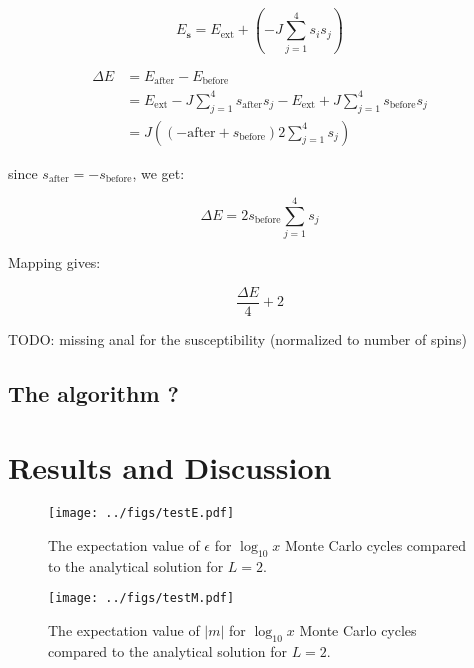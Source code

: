 \documentclass[english,notitlepage,reprint,nofootinbib]{revtex4-1}  %
\begin{document}
\begin{equation}
    E_{\mathbf{s}} = E_{\text{ext}} + \left( -J \sum\limits_{j = 1}^4 s_i s_j \right)
\end{equation}

\begin{align*}
    \Delta E &= E_{\text{after}} - E_{\text{before}} \\
    &= E_{\text{ext}} - J \sum\limits_{j = 1}^4 s_{\text{after}} s_j - E_{\text{ext}} + J \sum\limits_{j = 1}^4 s_{\text{before}} s_j \\
    &= J \left( \left( - \text{after} + s_{\text{before}} \right) 2 \sum\limits_{j = 1}^4 s_j \right)
\end{align*}

since $s_{\text{after}} = - s_{\text{before}}$, we get:

\begin{equation}
    \Delta E = 2 s_{\text{before}} \sum\limits_{j = 1}^4 s_j
\end{equation}

Mapping gives:

\begin{equation}
    \frac{\Delta E}{4} + 2
\end{equation}

TODO: missing anal for the susceptibility (normalized to number of spins)


\subsection*{The algorithm ?}

\section{Results and Discussion}\label{sec:results}

\begin{figure}[H]
	\centering
	\texttt{[image: ../figs/testE.pdf]} %
	\caption{The expectation value of $\epsilon$ for $\log_{10} x$ Monte Carlo cycles compared to the analytical solution for $L=2$.}
	\label{fig:testE}
\end{figure}

\begin{figure}[H]
	\centering
	\texttt{[image: ../figs/testM.pdf]} %
	\caption{The expectation value of $|m|$ for $\log_{10} x$ Monte Carlo cycles compared to the analytical solution for $L=2$.}
	\label{fig:testM}
\end{figure}
\end{document}
